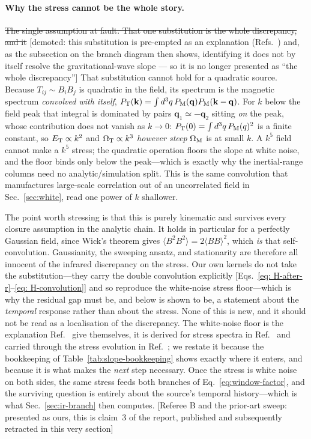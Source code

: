 \documentclass[10pt,prd,aps,nobibnotes,superscriptaddress,preprintnumbers,notitlepage]{revtex4-1}
\newcommand{\add}[1]{{\color{red}#1}}
\newcommand{\del}[1]{{\color{red}\sout{#1}}}
\newcommand{\why}[1]{{\color{red}\footnotesize\textsf{[#1]}}}
\newcommand{\add}[1]{#1}
\newcommand{\del}[1]{}
\newcommand{\why}[1]{}
\newcommand{\kb}{{\bf k}}
\begin{document}
\paragraph{\add{Why the stress cannot be the whole story.}}
\del{The single assumption at fault. That one substitution is the whole
discrepancy, and it}
\why{demoted: this substitution is pre-empted as an explanation
(Refs.~\cite{RoperPol:2019wvy,Brandenburg:2019uzj,Sharma:2022ysf}) and, as the
subsection on the branch diagram then shows, identifying it does not by itself resolve
the gravitational-wave slope --- so it is no longer presented as ``the whole
discrepancy''}
\add{That substitution} cannot hold for a quadratic source. Because $T_{ij}\sim B_iB_j$ is
quadratic in the field, its spectrum is the magnetic spectrum \emph{convolved with itself},
$P_{\rm T}(\kb)=\int d^3q\,P_{\rm M}(\mathbf{q})P_{\rm M}(\kb-\mathbf{q})$. For $k$ below the
field peak that integral is dominated by pairs $\mathbf{q}_1\simeq-\mathbf{q}_2$ sitting
\emph{on} the peak, whose
contribution does not vanish as $k\to0$: $P_{\rm T}(0)=\int d^3q\,P_{\rm M}(q)^2$ is a finite
constant, so $E_{\rm T}\propto k^2$ and $\Omega_{\rm T}\propto k^3$ \emph{however steep}
$\Omega_{\rm M}$ is at small $k$. A $k^5$ field cannot make a $k^5$ stress; the quadratic
operation floors the slope at white noise, and the floor binds only below the peak---which is
exactly why the inertial-range columns need no analytic/simulation split. This is the same
convolution that manufactures large-scale correlation out of an uncorrelated field in
Sec.~\ref{sec:white}, read one power of $k$ shallower.

The point worth stressing is that this is purely kinematic and survives every closure
assumption in the analytic chain. It holds in particular for a perfectly Gaussian field,
since Wick's theorem gives $\langle B^2B^2\rangle=2\langle BB\rangle^2$, which \emph{is} that
self-convolution. Gaussianity, the sweeping ansatz, and stationarity are therefore all
innocent of the infrared discrepancy \add{on the stress}. Our own kernels do not take the
substitution---they carry the double convolution
explicitly [Eqs.~\eqref{eq: H-after-r}--\eqref{eq: H-convolution}] and so reproduce the
white-noise stress floor---which is why the residual gap must be, and below is shown to be,
a statement about the \emph{temporal} response rather than about the stress.
\add{None of this is new, and it should not be read as a localisation of the
discrepancy. The white-noise floor is the explanation Ref.~\cite{RoperPol:2019wvy}
give themselves, it is derived for stress spectra in Ref.~\cite{Brandenburg:2019uzj}
and carried through the stress evolution in Ref.~\cite{Sharma:2022ysf}; we restate it
because the bookkeeping of Table~\ref{tab:slope-bookkeeping} shows exactly where it
enters, and because it is what makes the \emph{next} step necessary. Once the stress
is white noise on both sides, the same stress feeds both branches of
Eq.~\eqref{eq:window-factor}, and the surviving question is entirely about the
source's temporal history---which is what Sec.~\ref{sec:ir-branch} then computes.}
\why{Referee B and the prior-art sweep: presented as ours, this is claim~3 of the
report, published and subsequently retracted in this very section}
\end{document}
